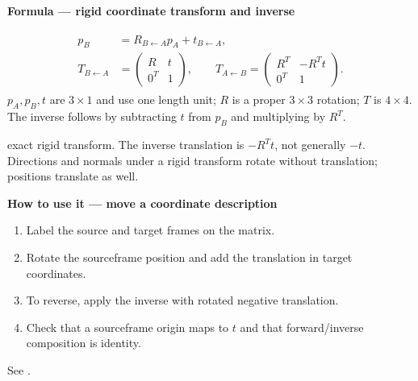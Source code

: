 \documentclass[letterpaper,11pt,english,openany,oneside]{jupyterBook}
\begin{document}
\begin{TextbookBox}
\textbf{Formula — rigid coordinate transform and inverse}\par\smallskip
\begin{equation}\label{equation:lectures/lecture01/frames-quizzes:eq-lec01-rigid3}
\begin{split}\begin{aligned}
p_B&=R_{B\leftarrow A}p_A+t_{B\leftarrow A},\\
T_{B\leftarrow A}&=\begin{pmatrix}R&t\\0^T&1\end{pmatrix},\qquad
T_{A\leftarrow B}=\begin{pmatrix}R^T&-R^Tt\\0^T&1\end{pmatrix}.
\end{aligned}\end{split}
\end{equation}
\sphinxAtStartPar
\(p_A,p_B,t\) are \(3\times1\) and use one length unit; \(R\) is a proper \(3\times3\) rotation; \(T\) is \(4\times4\). The inverse follows by subtracting \(t\) from \(p_B\) and multiplying by \(R^T\).

\sphinxAtStartPar
{} exact rigid transform. The inverse translation is \(-R^Tt\), not generally \(-t\). Directions and normals under a rigid transform rotate without translation; positions translate as well.

\end{TextbookBox}

\begin{TextbookBox}
\textbf{How to use it — move a coordinate description}\par\smallskip
\begin{enumerate}
%
\item {}
\sphinxAtStartPar
Label the source and target frames on the matrix.

\item {}
\sphinxAtStartPar
Rotate the source\sphinxhyphen{}frame position and add the translation in target coordinates.

\item {}
\sphinxAtStartPar
To reverse, apply the inverse with rotated negative translation.

\item {}
\sphinxAtStartPar
Check that a source\sphinxhyphen{}frame origin maps to \(t\) and that forward/inverse composition is identity.

\end{enumerate}

\sphinxAtStartPar
See {\hyperref[\detokenize{lectures/lecture01/quiz-workbook:ex-lec01-relative-pose}]{}}.

\end{TextbookBox}
\end{document}
